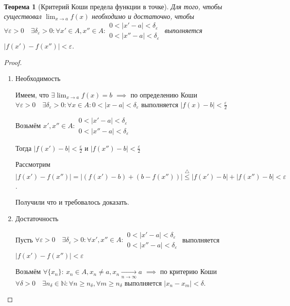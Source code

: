 \documentclass[a4paper,oneside]{article}
\newcommand{\dslim}{\displaystyle\lim}
\newcommand{\N}{\mathbb{N}}
\newcommand{\eps}{\varepsilon}
\newcommand{\approach}[1]{\underset{#1}{\longrightarrow}}
\newtheorem{theorem}{Теорема}[subsection]
\begin{document}
\begin{theorem}[Критерий Коши предела функции в точке]
    Для того, чтобы существовал $\dslim_{x \to a} f(x)$ необходимо и достаточно, чтобы
    $\forall \eps > 0 \quad \exists \delta_\eps > 0: \forall x' \in A, x'' \in A:
    \begin{array}{c}
        0 < | x' - a | < \delta_\eps \\
        0 < | x'' - a | < \delta_\eps
    \end{array}$ выполняется $| f(x') - f(x'') | < \eps$.
\end{theorem}
\begin{proof}
    \begin{enumerate}[label=\alph*)]
        \item 
            Необходимость

            Имеем, что $\exists \dslim_{x \to a} f(x) = b$ $\implies$ по определению Коши
            $\forall \eps > 0 \quad \exists \delta_\eps > 0: \forall x \in A: 0 < | x - a | < \delta_\eps$
            выполняется $| f(x) - b | < \frac{\eps}{2}$

            Возьмём $x', x'' \in A:
            \begin{array}{c}
                0 < | x' - a | < \delta_\eps \\
                0 < | x'' - a | < \delta_\eps
            \end{array}$

            Тогда $| f(x') - b | < \frac{\eps}{2}$ и $| f(x'') - b | < \frac{\eps}{2}$

            Рассмотрим $| f(x') - f(x'') | = | (f(x') - b) + (b - f(x'')) | \stackrel{\triangle}{\le}
            | f(x') - b | + | f(x'') - b | < \eps$.

            Получили что и требовалось доказать.
        
        \item
            Достаточность

            Пусть $\forall \eps > 0 \quad \exists \delta_\eps > 0: \forall x', x'' \in A:
            \begin{array}{c}
                0 < | x' - a | < \delta_\eps \\
                0 < | x'' - a | < \delta_\eps
            \end{array}$ выполняется $| f(x') - f(x'') | < \eps$

            Возьмём $\forall \{ x_n \}: \: x_n \in A, x_n \ne a, x_n \approach{n \to \infty} a$
            $\implies$ по критерию Коши $\forall \delta > 0 \quad \exists n_\delta \in \N:
            \forall n \ge n_\delta, \forall m \ge n_\delta$ выполняется $| x_n - x_m | < \delta$.


\end{enumerate}
\end{proof}
\end{document}
